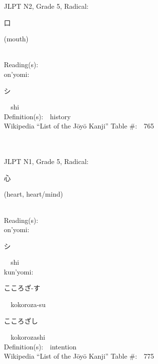 \begin{multicols}{2}
{JLPT N2, Grade 5, Radical:\ \ {\begin{CJK}{UTF8}{min} 口 \end{CJK}} (mouth) } \\
Reading(s):\ \ \\
{\hspace*{1em}}on'yomi:\ \ \\
{\hspace*{2em}}{\begin{CJK}{UTF8}{min} シ \end{CJK}}\ \ shi\ \ \\
Definition(s):\ \ history \\
Wikipedia ``List of the J\=oy\=o Kanji'' Table \#:\ \ 765 \\
\ \ \\
{\fontsize{34pt}{40pt}  }\ \ \\  %
{JLPT N1, Grade 5, Radical:\ \ {\begin{CJK}{UTF8}{min} 心 \end{CJK}} (heart, heart/mind) } \\
Reading(s):\ \ \\
{\hspace*{1em}}on'yomi:\ \ \\
{\hspace*{2em}}{\begin{CJK}{UTF8}{min} シ \end{CJK}}\ \ shi\ \ \\
{\hspace*{1em}}kun'yomi:\ \ \\
{\hspace*{2em}}{\begin{CJK}{UTF8}{min} こころざ-す \end{CJK}}\ \ kokoroza-su\ \ \\
{\hspace*{2em}}{\begin{CJK}{UTF8}{min} こころざし \end{CJK}}\ \ kokorozashi\ \ \\
Definition(s):\ \ intention \\
Wikipedia ``List of the J\=oy\=o Kanji'' Table \#:\ \ 775 \\
\ \ \\
{\fontsize{34pt}{40pt}  }\ \ \\  %

\end{multicols}
